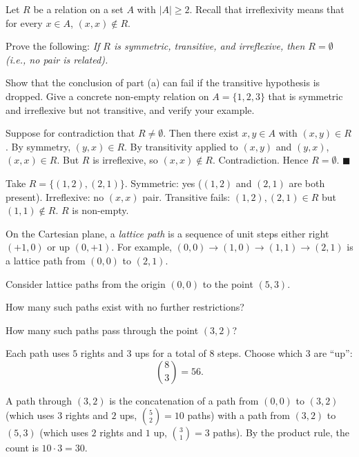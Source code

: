 \documentclass[test,letterpaper]{cs20}
\begin{document}
\begin{problem}

Let $R$ be a relation on a set $A$ with $|A| \geq 2$. Recall that irreflexivity means that for every $x \in A$, $(x, x) \notin R$.

\subproblem Prove the following: \emph{If $R$ is symmetric, transitive, and irreflexive, then $R = \emptyset$ (i.e., no pair is related).}

\subproblem Show that the conclusion of part (a) can fail if the transitive hypothesis is dropped. Give a concrete non-empty relation on $A = \{1, 2, 3\}$ that is symmetric and irreflexive but not transitive, and verify your example.

\begin{solution}
\subsolution Suppose for contradiction that $R \neq \emptyset$. Then there exist $x, y \in A$ with $(x, y) \in R$. By symmetry, $(y, x) \in R$. By transitivity applied to $(x, y)$ and $(y, x)$, $(x, x) \in R$. But $R$ is irreflexive, so $(x, x) \notin R$. Contradiction. Hence $R = \emptyset$. $\blacksquare$

\subsolution Take $R = \{(1, 2), (2, 1)\}$. Symmetric: yes ($(1,2)$ and $(2,1)$ are both present). Irreflexive: no $(x,x)$ pair. Transitive fails: $(1,2), (2,1) \in R$ but $(1,1) \notin R$. $R$ is non-empty.
\end{solution}

\pagebreak

\end{problem}

\begin{problem}

On the Cartesian plane, a \emph{lattice path} is a sequence of unit steps either right $(+1, 0)$ or up $(0, +1)$. For example, $(0,0) \to (1,0) \to (1,1) \to (2,1)$ is a lattice path from $(0,0)$ to $(2,1)$.

\bigskip

Consider lattice paths from the origin $(0,0)$ to the point $(5,3)$.

\subproblem How many such paths exist with no further restrictions?

\subproblem How many such paths pass through the point $(3, 2)$?

\begin{solution}
\subsolution Each path uses $5$ rights and $3$ ups for a total of $8$ steps. Choose which $3$ are ``up'':
\[
\binom{8}{3} = 56.
\]

\subsolution A path through $(3, 2)$ is the concatenation of a path from $(0,0)$ to $(3,2)$ (which uses $3$ rights and $2$ ups, $\binom{5}{2} = 10$ paths) with a path from $(3,2)$ to $(5,3)$ (which uses $2$ rights and $1$ up, $\binom{3}{1} = 3$ paths). By the product rule, the count is $10 \cdot 3 = 30$.
\end{solution}

\pagebreak

\end{problem}
\end{document}
